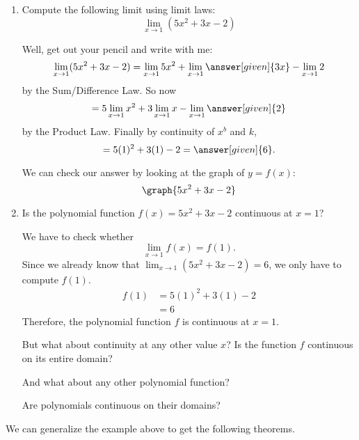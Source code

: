 \documentclass{ximera}
\begin{document}
\begin{example}
\begin{enumerate}
\item  Compute the following limit using limit laws:
\[
  \lim_{x\to 1}(5x^2+3x-2)
\]
\begin{explanation}
  Well, get out your pencil and write with me:
  \[
  \lim_{x\to 1} (5x^2+3x-2) = \lim_{x\to 1} 5x^2 + \lim_{x\to 1} \answer[given]{3x} - \lim_{x\to 1}2
  \]
  by the Sum/Difference Law. So now
  \[
  = 5\lim_{x\to 1} x^2 + 3\lim_{x\to 1} x - \lim_{x\to 1}\answer[given]{2}
  \]
  by the Product Law. Finally by continuity of $x^b$ and $k$,
  \[
  = 5(1)^2 + 3(1) - 2 =\answer[given]{6}.
  \]
  \begin{onlineOnly}
    We can check our answer by looking at the graph of $y=f(x)$:
    \[
    \graph{5x^2+3x-2}
    \]
  \end{onlineOnly}
\end{explanation}
\item Is the polynomial function  $f(x)=5x^2+3x-2$ continuous at $x=1$?
\begin{explanation}
We have to check whether
\[
 \lim_{x\to 1} f(x)=f(1).
\]
Since we already know that $ \lim_{x\to 1} (5x^2+3x-2)=6$,  we only have  to compute $f(1)$.
\begin{align*}
f(1)&=5(1)^2 + 3(1) - 2\\
&=6
\end{align*}
Therefore, the polynomial function $f$ is continuous at $x=1$.

But what about continuity at any other value $x$? Is the function $f$ continuous on its entire domain?

And what about any other polynomial function?

Are polynomials continuous on their domains?
\end{explanation}
\end{enumerate}
\end{example}

We can generalize the example above to get the following theorems.
\end{document}
